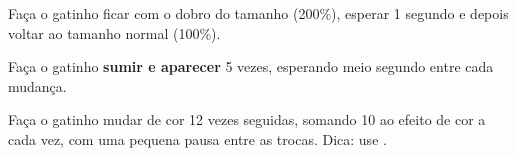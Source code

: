 \begin{exercicio}
Faça o gatinho ficar com o dobro do tamanho (200\%), esperar 1 segundo e depois voltar ao tamanho normal (100\%).
\end{exercicio}

\begin{solucao}
\begin{pilha}
\end{pilha}
\end{solucao}

\begin{exercicio}
Faça o gatinho \textbf{sumir e aparecer} 5 vezes, esperando meio segundo entre cada mudança.
\end{exercicio}

\begin{solucao}
\begin{pilha}
\sbcend
\end{pilha}
\end{solucao}

\begin{desafio}
Faça o gatinho mudar de cor 12 vezes seguidas, somando 10 ao efeito de cor a cada vez, com uma pequena pausa entre as trocas. Dica: use .
\end{desafio}

\begin{solucao}
\begin{pilha}
\sbcend
\end{pilha}
\end{solucao}
